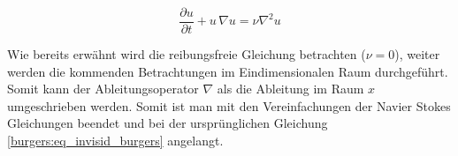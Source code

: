 		\begin{equation}
			 \frac{\partial u}{\partial t} + u \,\nabla u = \nu \nabla^2 u 
			 \label{burgers:eq_navier3}
		\end{equation}
		
		Wie bereits erw\"ahnt wird die reibungsfreie Gleichung betrachten ($\nu = 0$), weiter werden die kommenden Betrachtungen im Eindimensionalen Raum durchgef\"uhrt.
		Somit kann der Ableitungsoperator $\nabla$ als die Ableitung im Raum $x$ umgeschrieben werden.
		Somit ist man mit den Vereinfachungen der Navier Stokes Gleichungen beendet und bei der urspr\"unglichen Gleichung \eqref{burgers:eq_invisid_burgers} angelangt.
	
		